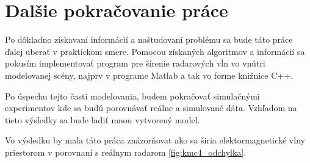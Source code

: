   \section{Dalšie pokračovanie práce}
    \hspace{0.6cm}Po dôkladno získavaní informácií a naštudovaní problému sa bude táto práce ďalej uberať v praktickom smere. Pomocou získaných algoritmov a informácií sa pokusím implementovať program pre šírenie radarových vĺn vo vnútri modelovanej scény, najprv v programe Matlab a tak vo forme knižnice C++.

    Po úspechu tejto časti modelovania, budem pokračovať simulačnými experimentov kde sa budú porovnávať reálne a simulované dáta. Vzhľadom na tieto výsledky sa bude ladiť mnou vytvorený model. 

    Vo výsledku by mala táto práca znázorňovat ako sa širia elektormagnetické vlny priestorom v porovnaní s reálnym radarom \ref{fig:kmc4_odchylka}.



